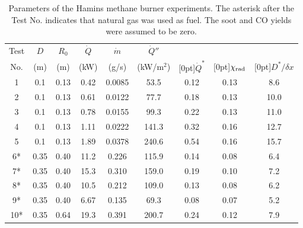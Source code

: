 \begin{table}[!ht]
\caption[Parameters of the Hamins methane burner experiments]{Parameters of the Hamins methane burner experiments. The asterisk after the Test No. indicates that natural gas was used as fuel. The soot and CO yields were assumed to be zero.}
\begin{center}
\begin{tabular}{|c|c|c|c|c|c|c||c|c|}
\hline
Test      & $D$      & $R_0$      & $\dot{Q}$   &  $\dot{m}$            &  $\dot{Q}''$   &               &            &          \\
No.       & (m)      & (m)        & (kW)        &  (g/s)                &  (kW/m$^2$)    & \raisebox{1.5ex}[0pt]{$\dot{Q}^*$} & \raisebox{1.5ex}[0pt]{$\chi_{\rm rad}$} & \raisebox{1.5ex}[0pt]{$D^*/\delta x$} \\ \hline \hline
1         & 0.1      & 0.13       & 0.42        &  0.0085               &  53.5          & 0.12          & 0.13       & 8.6     \\ \hline
2         & 0.1      & 0.13       & 0.61        &  0.0122               &  77.7          & 0.18          & 0.13       & 10.0     \\ \hline
3         & 0.1      & 0.13       & 0.78        &  0.0155               &  99.3          & 0.22          & 0.13       & 11.0     \\ \hline
4         & 0.1      & 0.13       & 1.11        &  0.0222               &  141.3         & 0.32          & 0.16       & 12.7      \\ \hline
5         & 0.1      & 0.13       & 1.89        &  0.0378               &  240.6         & 0.54          & 0.16       & 15.7      \\ \hline
6*        & 0.35     & 0.40       & 11.2        &  0.226                &  115.9         & 0.14          & 0.08       & 6.4      \\ \hline
7*        & 0.35     & 0.40       & 15.3        &  0.310                &  159.0         & 0.19          & 0.10       & 7.2      \\ \hline
8*        & 0.35     & 0.40       & 10.5        &  0.212                &  109.0         & 0.13          & 0.08       & 6.2      \\ \hline
9*        & 0.35     & 0.40       & 6.67        &  0.135                &  69.3          & 0.08          & 0.07       & 5.2      \\ \hline
10*       & 0.35     & 0.64       & 19.3        &  0.391                &  200.7         & 0.24          & 0.12       & 7.9      \\ \hline

\end{tabular}
\end{center}
\end{table}
